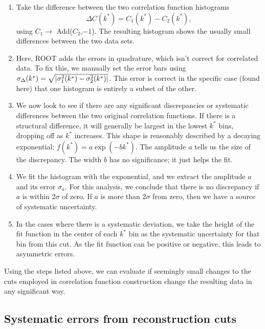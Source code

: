 \begin{enumerate}
\item Take the difference between the two correlation function histograms $$\Delta C(k^*) = C_1(k^*) - C_2(k^*),$$ using $C_1\rightarrow$ Add($C_2$,$-1$).  
The resulting histogram shows the usually small differences between the two data sets.
\item Here, ROOT adds the errors in quadrature, which isn't correct for correlated data.  
To fix this, we manually set the error bars using $\sigma_{\Delta}(k^*) = \sqrt{ \left\lvert \sigma_1^2(k^*) - \sigma_2^2(k^*) \right\rvert}$.  
This error is correct in the specific case (found here) that one histogram is entirely a subset of the other.
\item We now look to see if there are any significant discrepancies or systematic differences between the two original correlation functions.
If there is a structural difference, it will generally be largest in the lowest $k^*$ bins, dropping off as $k^*$ increases.
This shape is reasonably described by a decaying exponential: $f(k^*) = a \exp(-b k^*)$. 
The amplitude $a$ tells us the size of the discrepancy. The width $b$ has no significance; it just helps the fit.
\item We fit the histogram with the exponential, and we extract the amplitude $a$ and its error $\sigma_a$.
For this analysis, we conclude that there is no discrepancy if $a$ is within 2$\sigma$ of zero.
If $a$ is more than 2$\sigma$ from zero, then we have a source of systematic uncertainty.
\item In the cases where there is a systematic deviation, we take the height of the fit function in the center of each $k^*$ bin as the systematic uncertainty for that bin from this cut.
As the fit function can be positive or negative, this leads to asymmetric errors.

\end{enumerate}

Using the steps listed above, we can evaluate if seemingly small changes to the cuts employed in correlation function construction change the resulting data in any significant way.  


\subsection{Systematic errors from reconstruction cuts}
\label{sec:SystematicsReconstruction}

